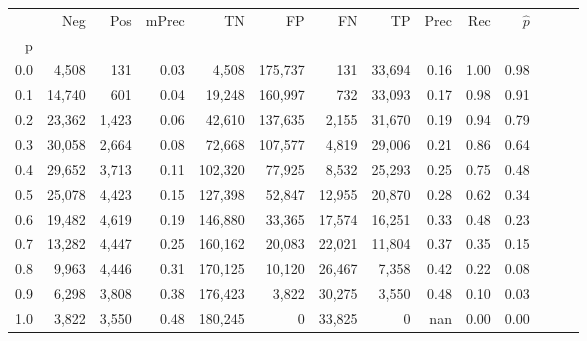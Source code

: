 \begin{tabular}{rrrrrrrrrrrrrr}
\toprule
{} &     Neg &    Pos & mPrec &       TN &       FP &      FN &      TP &  Prec &   Rec & $\hat{p}$ \\
p   &         &        &       &          &          &         &         &       &       &           \\
\midrule
0.0 &   4,508 &    131 &  0.03 &    4,508 &  175,737 &     131 &  33,694 &  0.16 &  1.00 &      0.98 \\
0.1 &  14,740 &    601 &  0.04 &   19,248 &  160,997 &     732 &  33,093 &  0.17 &  0.98 &      0.91 \\
0.2 &  23,362 &  1,423 &  0.06 &   42,610 &  137,635 &   2,155 &  31,670 &  0.19 &  0.94 &      0.79 \\
0.3 &  30,058 &  2,664 &  0.08 &   72,668 &  107,577 &   4,819 &  29,006 &  0.21 &  0.86 &      0.64 \\
0.4 &  29,652 &  3,713 &  0.11 &  102,320 &   77,925 &   8,532 &  25,293 &  0.25 &  0.75 &      0.48 \\
0.5 &  25,078 &  4,423 &  0.15 &  127,398 &   52,847 &  12,955 &  20,870 &  0.28 &  0.62 &      0.34 \\
0.6 &  19,482 &  4,619 &  0.19 &  146,880 &   33,365 &  17,574 &  16,251 &  0.33 &  0.48 &      0.23 \\
0.7 &  13,282 &  4,447 &  0.25 &  160,162 &   20,083 &  22,021 &  11,804 &  0.37 &  0.35 &      0.15 \\
0.8 &   9,963 &  4,446 &  0.31 &  170,125 &   10,120 &  26,467 &   7,358 &  0.42 &  0.22 &      0.08 \\
0.9 &   6,298 &  3,808 &  0.38 &  176,423 &    3,822 &  30,275 &   3,550 &  0.48 &  0.10 &      0.03 \\
1.0 &   3,822 &  3,550 &  0.48 &  180,245 &        0 &  33,825 &       0 &   nan &  0.00 &      0.00 \\
\bottomrule
\end{tabular}
